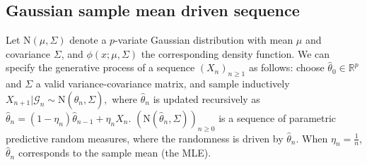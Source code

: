 \documentclass{article}
\theoremstyle{definition}
\renewcommand{\&}{and}
\begin{document}
\subsection{Gaussian sample mean driven sequence}\label{sec:gauss_pred}

Let $\text{N}(\mu,\Sigma)$ denote a $p$-variate Gaussian distribution with mean $\mu$ and covariance $\Sigma$, and $\phi(x;\mu,\Sigma)$ the corresponding density function. We can specify the generative process of a sequence $(X_n)_{n\geq 1}$ as follows: 
choose $\hat{\theta}_{0} \in \mathbb{R}^p$ and $\Sigma$ a valid variance-covariance matrix, and %
sample inductively 
    $X_{n+1}|\mathcal{G}_{n} \sim \text{N}(\hat{\theta}_{n},\Sigma),$
where %
$\hat{\theta}_{n}$ is updated recursively as $\hat{\theta}_{n} = (1-\eta_{n}) \hat{\theta}_{n-1} + \eta_{n} X_{n}$. %
 $(\text{N}(\hat{\theta}_{n},\Sigma))_{n \geq 0}$ is a sequence of  parametric predictive random measures, where the randomness is driven by $\hat{\theta}_n$. When $\eta_n=\frac{1}{n}$, $\hat{\theta}_n$ corresponds to the sample mean (the MLE). %
 
\end{document}
